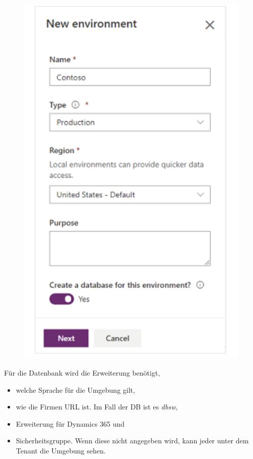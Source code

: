 \begin{figure}[H]
	\centering
	\includegraphics[scale = 0.3]{attachment/chapter_13/Scc018}
\end{figure}
Für die Datenbank wird die Erweiterung benötigt, 
\begin{itemize}
	\item welche Sprache für die Umgebung gilt,
	\item wie die Firmen URL ist. Im Fall der \gls{DB} ist es \textit{dbsw},
	\item Erweiterung für Dynamics 365 und 
	\item Sicherheitsgruppe. Wenn diese nicht angegeben wird, kann jeder unter dem Tenant die Umgebung sehen.
\end{itemize}
